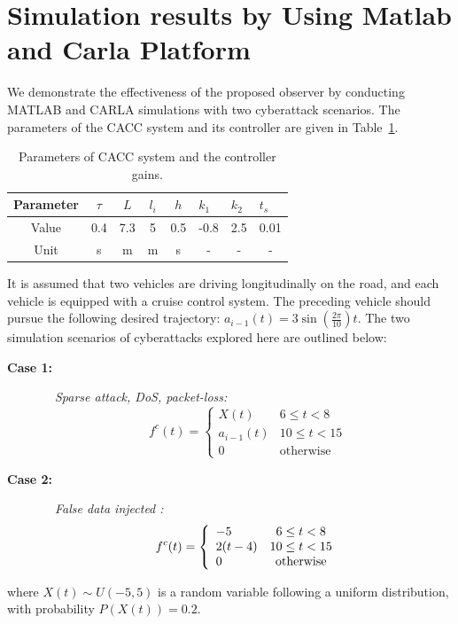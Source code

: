 {%
\section{Simulation results by Using Matlab and Carla Platform}\label{ch3_secs_sim}
We demonstrate the effectiveness of the proposed observer by conducting MATLAB and CARLA simulations with two cyberattack scenarios. The parameters of the CACC system and its controller are given in Table~\ref{tab:simple}. 
\begin{table}[h!]
\centering
\begin{tabular}{|c|c|c|c|c|l|c|c|}
\hline
Parameter & $\tau$ & $L$ & $l_{i}$ & $h$ & $k_1$                  & \multicolumn{1}{l|}{$k_2$} & \multicolumn{1}{l|}{$t_s$} \\ \hline
Value     & 0.4    & 7.3     & 5       & 0.5 & -0.8                   & 2.5                        & 0.01                       \\ \hline
Unit      & s      & m       & m       & s   & \multicolumn{1}{c|}{-} & -                          & -                          \\ \hline
\end{tabular}
\caption{Parameters of CACC system and the controller gains.}
\label{tab:simple}
\end{table}

It is assumed that two vehicles are driving longitudinally on the road, and
each vehicle is equipped with a cruise control system.
The preceding vehicle should pursue the following desired trajectory:
$a_{i-1}(t) = 3\sin(\frac{2\pi}{10})t$. The two simulation scenarios of cyberattacks explored here are outlined below: 
\begin{description}
\item[\textbf{Case 1:}]~~{\it Sparse attack, DoS, packet-loss:}
\begin{equation}\label{attack1}
    f^c(t)=\left\{\begin{array}{ll}
    X(t) &   6 \leq t < 8 \\
    a_{i-1}(t) & 10 \leq t < 15 \\
    0 & \text{otherwise}
\end{array}\right.
\end{equation}
\item[\textbf{Case 2:}]~~{\it False data injected :}
 \begin{equation}\label{attack2}
        f^c(t)=\left\{\begin{array}{lc}
            -5 & 6\leq t < 8 \\
            2(t-4) & 10 \leq t < 15  \\
            0 & {\rm otherwise} 
        \end{array}\right.
    \end{equation}
\end{description}
where $X(t) \sim U(-5, 5)$ is a random variable following a uniform distribution, with probability $P(X(t)) = 0.2 $.


}
